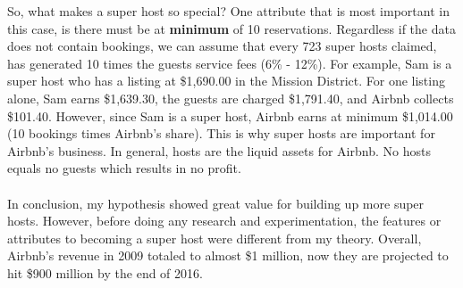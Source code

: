 \documentclass[10pt,letterpapter]{article}
\begin{document}
\indent \indent
So, what makes a super host so special? One attribute that is most important in this case, is there must be at \textbf{minimum} of 10 reservations. Regardless if the data does not contain bookings, we can assume that every 723 super hosts claimed, has generated 10 times the guests service fees (6\% - 12\%). For example, Sam is a super host who has a listing at \$1,690.00 in the Mission District. For one listing alone, Sam earns \$1,639.30, the guests are charged \$1,791.40, and Airbnb collects \$101.40. However, since Sam is a super host, Airbnb earns at minimum \$1,014.00 (10 bookings times Airbnb's share). This is why super hosts are important for Airbnb's business. In  general, hosts are the liquid assets for Airbnb. No hosts equals no guests which results in no profit. 
\\ \\
\indent \indent 
In conclusion, my hypothesis showed great value for building up more super hosts. However, before doing any research and experimentation, the features or attributes to becoming a super host were different from my theory. Overall, Airbnb's revenue in 2009 totaled to almost \$1 million, now they are projected to hit \$900 million by the end of 2016.

\end{document}
